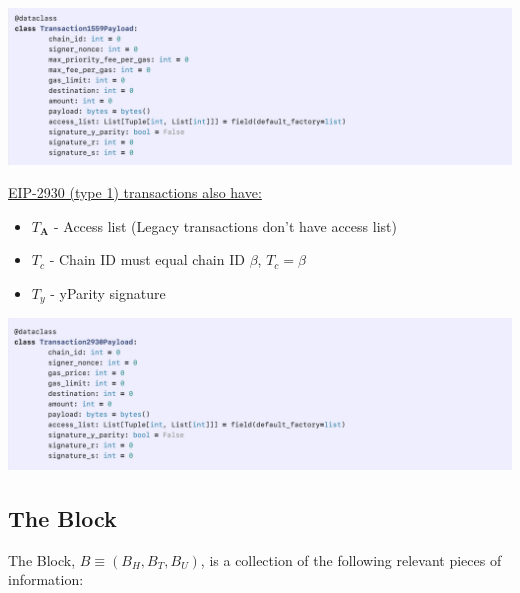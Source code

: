 \documentclass{article}
\begin{document}
\begin{itemize}
\begin{itemize}
    \end{itemize}
    \includegraphics[width=\textwidth]{EIP1559.png}
    
    \underline{EIP-2930 (type 1) transactions also have:}
    \begin{itemize}
        \item $T\bm{_A}$ - Access list (Legacy transactions don't have access list)
         \item $T_c$ - Chain ID must equal chain ID $\beta$, $T_c = \beta$
        \item $T_y$ - yParity signature 
    \end{itemize}
    
    \includegraphics[width=\textwidth]{EIP2930.png}
    
\end{itemize}

\subsection{The Block}

The Block, $B \equiv (B_H, B_T, B_U)$, is a collection of the following relevant pieces  of information: 
\end{document}
